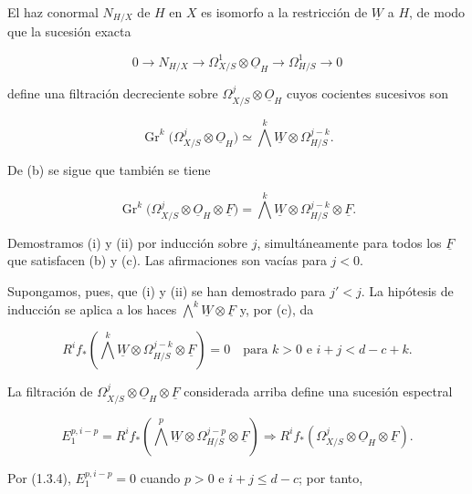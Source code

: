 El haz conormal $N_{H/X}$ de $H$ en $X$ es isomorfo a la restricción de
$\underline W$ a $H$, de modo que la sucesión exacta

\begin{equation}\tag{1.3.1}
0\longrightarrow N_{H/X}\longrightarrow
\Omega^1_{X/S}\otimes\underline O_H\longrightarrow
\Omega^1_{H/S}\longrightarrow0
\end{equation}

define una filtración decreciente sobre
$\Omega^j_{X/S}\otimes\underline O_H$ cuyos cocientes sucesivos son

\begin{equation}\tag{1.3.2}
\operatorname{Gr}^k\bigl(\Omega^j_{X/S}\otimes\underline O_H\bigr)
\simeq\bigwedge^k\underline W\otimes\Omega^{j-k}_{H/S}.
\end{equation}

De (b) se sigue que también se tiene

\begin{equation}\tag{1.3.3}
\operatorname{Gr}^k\bigl(\Omega^j_{X/S}\otimes\underline O_H
\otimes\underline F\bigr)
=\bigwedge^k\underline W\otimes\Omega^{j-k}_{H/S}
\otimes\underline F.
\end{equation}

Demostramos (i) y (ii) por inducción sobre $j$, simultáneamente para todos
los $\underline F$ que satisfacen (b) y (c). Las afirmaciones son vacías
para $j<0$.

\pageoriginale

Supongamos, pues, que (i) y (ii) se han demostrado para $j'<j$. La
hipótesis de inducción se aplica a los haces
$\bigwedge^k\underline W\otimes\underline F$ y, por (c), da

\begin{equation}\tag{1.3.4}
R^if_*\left(\bigwedge^k\underline W\otimes
\Omega^{j-k}_{H/S}\otimes\underline F\right)=0
\quad\text{para }k>0\text{ e }i+j<d-c+k.
\end{equation}

La filtración de
$\Omega^j_{X/S}\otimes\underline O_H\otimes\underline F$ considerada
arriba define una sucesión espectral

\begin{equation*}
E_1^{p,i-p}=R^if_*\left(\bigwedge^p\underline W\otimes
\Omega^{j-p}_{H/S}\otimes\underline F\right)
\Longrightarrow
R^if_*\left(\Omega^j_{X/S}\otimes\underline O_H
\otimes\underline F\right).
\end{equation*}

Por (1.3.4), $E_1^{p,i-p}=0$ cuando $p>0$ e $i+j\leq d-c$; por tanto,

